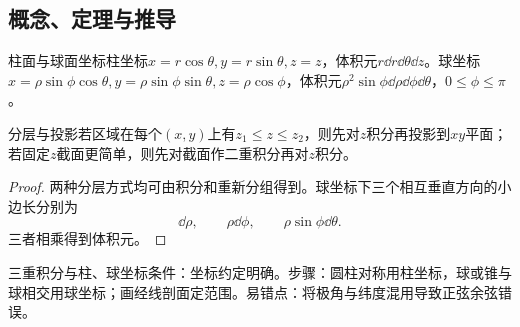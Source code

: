 \subsection{概念、定理与推导}

\begin{definition}{柱面与球面坐标}柱坐标$x=r\cos\theta,y=r\sin\theta,z=z$，体积元$r\dd r\dd\theta\dd z$。球坐标$x=\rho\sin\phi\cos\theta,y=\rho\sin\phi\sin\theta,z=\rho\cos\phi$，体积元$\rho^2\sin\phi\dd\rho\dd\phi\dd\theta$，$0\le\phi\le\pi$。\end{definition}
\begin{theorem}{分层与投影}若区域在每个$(x,y)$上有$z_1\le z\le z_2$，则先对$z$积分再投影到$xy$平面；若固定$z$截面更简单，则先对截面作二重积分再对$z$积分。\end{theorem}
\begin{proof}两种分层方式均可由积分和重新分组得到。球坐标下三个相互垂直方向的小边长分别为\[\dd\rho,\qquad\rho\dd\phi,\qquad\rho\sin\phi\dd\theta.\]三者相乘得到体积元。\end{proof}

\begin{method}{三重积分与柱、球坐标}条件：坐标约定明确。步骤：圆柱对称用柱坐标，球或锥与球相交用球坐标；画经线剖面定范围。易错点：将极角与纬度混用导致正弦余弦错误。\end{method}
